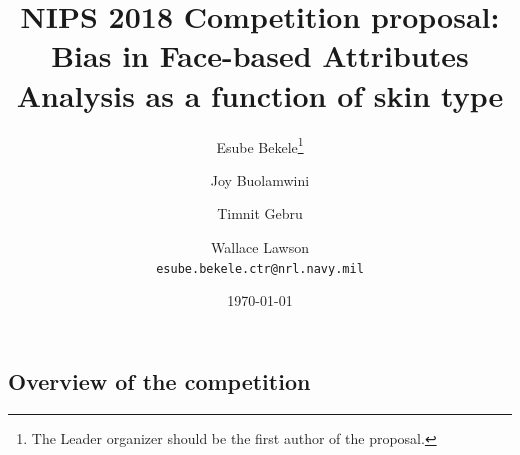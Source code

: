 \documentclass[11pt, oneside]{article}
\title{NIPS 2018 Competition proposal: Bias in Face-based Attributes Analysis
 as a function of skin type}
\author{Esube Bekele\thanks{The Leader organizer should be the first author of
		 the proposal.} \and Joy Buolamwini \and Timnit Gebru \and Wallace
	 Lawson \\
{\tt esube.bekele.ctr@nrl.navy.mil}\\
}
\date{\today}
\begin{document}
\maketitle


\subsection{Overview of the competition}
\end{document}
